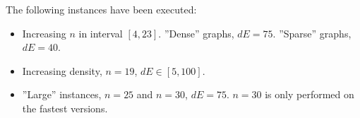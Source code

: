 \documentclass[a4paper]{article}
\newcommand{\code}{\texttt}
\begin{document}

The following instances have been executed:

\begin{itemize}
 \item Increasing $n$ in interval $[4, 23]$.
 \subitem ''Dense'' graphs, $dE = 75$.
 \subitem ''Sparse'' graphs, $dE = 40$.
 \item Increasing density, $n = 19$, $dE \in [5, 100]$.
 \item ''Large'' instances, $n = 25$ and $n = 30$, $dE = 75$.
 \subitem $n = 30$ is only performed on the fastest versions.
\end{itemize}

% 
% 
% 
\end{document}
